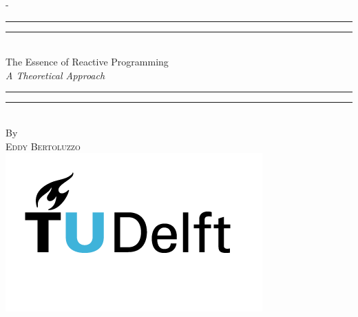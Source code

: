 %
%
% 
%
%
\begin{titlingpage}
\begin{SingleSpace}
\calccentering{\unitlength} 
\begin{adjustwidth*}{\unitlength}{-\unitlength}
\vspace*{13mm}
\begin{center}
\rule[0.5ex]{\linewidth}{2pt}\vspace*{-\baselineskip}\vspace*{3.2pt}
\rule[0.5ex]{\linewidth}{1pt}\\[\baselineskip]
{\HUGE The Essence of Reactive Programming}\\[4mm]
{\Large \textit{A Theoretical Approach}}\\
\rule[0.5ex]{\linewidth}{1pt}\vspace*{-\baselineskip}\vspace{3.2pt}
\rule[0.5ex]{\linewidth}{2pt}\\
\vspace{6.5mm}
{\large By}\\
\vspace{6.5mm}
{\large\textsc{Eddy Bertoluzzo}}\\
\vspace{11mm}
\includegraphics[scale=0.6]{logos/TU_Delft_logo_RGB}\\

\end{center}
\end{adjustwidth*}
\end{SingleSpace}
\end{titlingpage}
